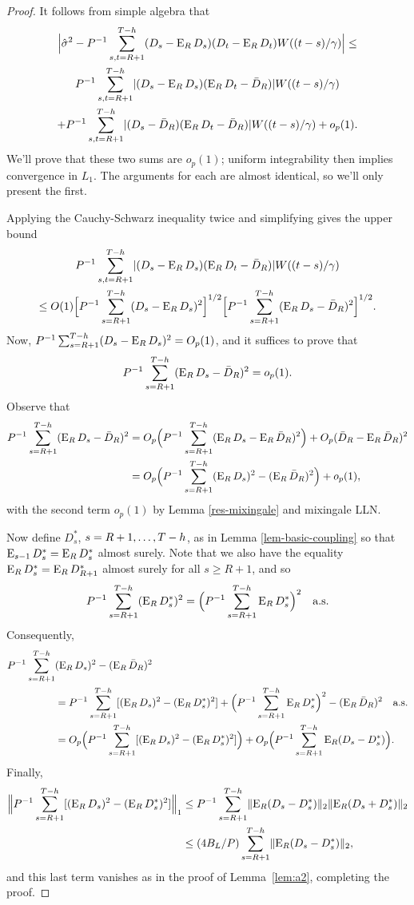 \documentclass[12pt]{article}
\begin{document}
\begin{proof}
   It follows from simple algebra that
\begin{multline*}
  \Big| \hat{\sigma}^2 -  P^{-1} \sum_{s,t=R+1}^{T-h} (D_s - \operatorname{E}_R
    D_s) (D_t - \operatorname{E}_R D_t) W((t-s)/\gamma) \Big| \leq\\
  P^{-1} \sum_{s,t=R+1}^{T-h} \lvert (D_s - \operatorname{E}_R D_s)(\operatorname{E}_R D_t - \bar{D}_{R}) \rvert W((t-s)/\gamma) \\ + P^{-1} \sum_{s,t=R+1}^{T-h} \lvert (D_s -
  \bar{D}_{R})(\operatorname{E}_R D_t - \bar{D}_{R}) \rvert W((t-s)/\gamma) + o_p(1).
\end{multline*}
We'll prove that these two sums are $o_p(1)$; uniform integrability
then implies convergence in $L_1$.  The arguments for each are almost
identical, so we'll only present the first.

Applying the Cauchy-Schwarz inequality twice and simplifying gives the
upper bound
\begin{multline*}
P^{-1} \sum_{s,t=R+1}^{T-h} \lvert (D_s - \operatorname{E}_R D_s)(\operatorname{E}_R D_t - \bar{D}_{R}) \rvert W((t-s)/\gamma) \\ \leq O(1) \Big[P^{-1} \sum_{s=R+1}^{T-h} (D_s - \operatorname{E}_R D_s)^2\Big]^{1/2} \Big[P^{-1} \sum_{s=R+1}^{T-h}(\operatorname{E}_R D_s - \bar{D}_{R} )^2\Big]^{1/2}.
\end{multline*}
Now,
$P^{-1} \sum_{s=R+1}^{T-h}(D_s - \operatorname{E}_R D_s)^2 = O_p(1)$, and it suffices to prove
that \[P^{-1} \sum_{s=R+1}^{T-h}(\operatorname{E}_R D_s - \bar{D}_{R} )^2 = o_p(1).\]  Observe that
\begin{align*}
  P^{-1} \sum_{s=R+1}^{T-h}(\operatorname{E}_R D_s - \bar{D}_{R} )^2 & = O_p\Big(P^{-1} \sum_{s=R+1}^{T-h}(\operatorname{E}_{R}D_s -
  \operatorname{E}_R\bar{D}_{R})^2\Big) + O_p(\bar{D}_{R} - \operatorname{E}_R\bar{D}_{R})^{2} \\
  &= O_p\Big(P^{-1} \sum_{s=R+1}^{T-h} (\operatorname{E}_RD_s)^2 - (\operatorname{E}_R\bar{D}_{R})^2\Big) +
  o_p(1),
\end{align*}
with the second term $o_p(1)$ by Lemma \ref{res-mixingale} and
 mixingale LLN.

Now define $D_s^*$, $s = R+1,\dots,T-h$, as in Lemma
\ref{lem-basic-coupling} so that $\operatorname{E}_{s-1} D_s^* = \operatorname{E}_R D_s^*$ almost
surely.  Note that we also have the equality $\operatorname{E}_R D_s^* = \operatorname{E}_R
D_{R+1}^*$ almost surely for all $s\geq R+1$, and so
\[
P^{-1} \sum_{s=R+1}^{T-h} (\operatorname{E}_R D_s^*)^2 = \Big(P^{-1} \sum_{s=R+1}^{T-h} \operatorname{E}_R
D_s^*\Big)^2 \quad \text{a.s.}
\]
Consequently,
\begin{align*}
P^{-1} \sum_{s=R+1}^{T-h}& (\operatorname{E}_R D_s)^2 - (\operatorname{E}_R\bar{D}_{R})^2 \\
&= P^{-1} \sum_{s=R+1}^{T-h} [(\operatorname{E}_R D_s)^2 - (\operatorname{E}_R D_s^*)^2]
 + \Big(P^{-1} \sum_{s=R+1}^{T-h} \operatorname{E}_R D_s^*\Big)^2 - (\operatorname{E}_R\bar{D}_{R})^2 \quad \text{a.s}.\\
&= O_p\Big(P^{-1} \sum_{s=R+1}^{T-h} [(\operatorname{E}_R D_s)^2 - (\operatorname{E}_R D_s^*)^2]\Big)
 + O_p\Big(P^{-1} \sum_{s=R+1}^{T-h} \operatorname{E}_R (D_s - D_s^*)\Big).
\end{align*}
Finally,
\begin{align*}
\Big\lVert P^{-1} \sum_{s=R+1}^{T-h} [(\operatorname{E}_RD_s)^2 - (\operatorname{E}_R D_s^*)^2] \Big\rVert_1
&\leq P^{-1} \sum_{s=R+1}^{T-h} \lVert \operatorname{E}_R (D_s - D_s^*) \rVert_2 \lVert
\operatorname{E}_R (D_s + D_s^*) \rVert_2
\\ &\leq (4 B_L/P) \sum_{s=R+1}^{T-h} \lVert \operatorname{E}_R (D_s - D_s^*) \rVert_2,
\end{align*}
and this last term vanishes as in the proof of Lemma~\ref{lem:a2},
completing the proof.
\end{proof}
\end{document}
